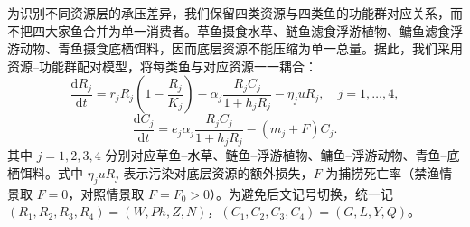\documentclass{MMCStyle}
\begin{document}
为识别不同资源层的承压差异，我们保留四类资源与四类鱼的功能群对应关系，而不把四大家鱼合并为单一消费者。草鱼摄食水草、鲢鱼滤食浮游植物、鳙鱼滤食浮游动物、青鱼摄食底栖饵料，因而底层资源不能压缩为单一总量。据此，我们采用资源--功能群配对模型，将每类鱼与对应资源一一耦合：
\begin{equation}
\frac{\mathrm{d}R_j}{\mathrm{d}t}
=r_j R_j\left(1-\frac{R_j}{K_j}\right)-\alpha_j\frac{R_j C_j}{1+h_jR_j}-\eta_j u R_j,\quad j=1,\dots,4,
\end{equation}
\begin{equation}
\frac{\mathrm{d}C_j}{\mathrm{d}t}
=e_j\alpha_j\frac{R_j C_j}{1+h_jR_j}-(m_j+F)C_j.
\end{equation}
其中 $j=1,2,3,4$ 分别对应草鱼--水草、鲢鱼--浮游植物、鳙鱼--浮游动物、青鱼--底栖饵料。式中 $\eta_j u R_j$ 表示污染对底层资源的额外损失，$F$ 为捕捞死亡率（禁渔情景取 $F=0$，对照情景取 $F=F_0>0$）。为避免后文记号切换，统一记 $(R_1,R_2,R_3,R_4)=(W,Ph,Z,N)$，$(C_1,C_2,C_3,C_4)=(G,L,Y,Q)$。
\end{document}
